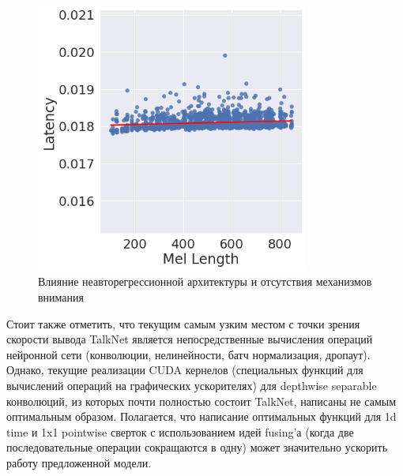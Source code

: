 \begin{figure}[!ht]
\centering
\includegraphics[width=0.8\textwidth]{images/len-lat.png}
\caption{Влияние неавторегрессионной архитектуры и отсутствия механизмов внимания}
\label{fig:len-lat}
\end{figure}

Стоит также отметить, что текущим самым узким местом с точки зрения скорости вывода TalkNet является непосредственные вычисления операций нейронной сети (конволюции, нелинейности, батч нормализация, дропаут). Однако, текущие реализации CUDA кернелов (специальных функций для вычислений операций на графических ускорителях) для depthwise separable конволюций, из которых почти полностью состоит TalkNet, написаны не самым оптимальным образом. Полагается, что написание оптимальных функций для 1d time и 1x1 pointwise сверток с использованием идей fusing'а (когда две последовательные операции сокращаются в одну) может значительно ускорить работу предложенной модели.